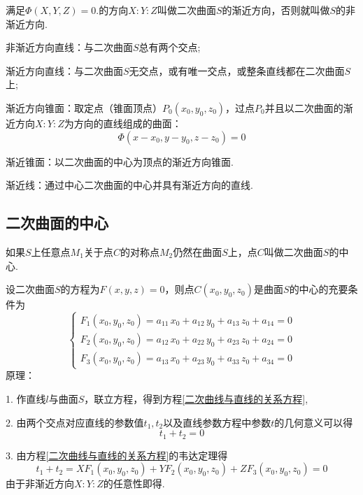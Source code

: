 满足$\varPhi(X,Y,Z) = 0.$的方向$X:Y:Z$叫做二次曲面$S$的{\color{dy}渐近方向}，否则就叫做$S$的{\color{dy}非渐近方向}.
\par \kg  \kg 非渐近方向直线：与二次曲面$S$总有两个交点;
\par \kg \kg 渐近方向直线：与二次曲面$S$无交点，或有唯一交点，或整条直线都在二次曲面$S$上;
\par {\color{dy}渐近方向锥面}：取定点（锥面顶点）$P_0(x_0,y_0,z_0)$，过点$P_0$并且以二次曲面的渐近方向$X:Y:Z$为方向的直线组成的曲面：
$$
\varPhi(x-x_0,y-y_0,z-z_0) = 0
$$
\par {\color{dy}渐近锥面}：以二次曲面的中心为顶点的渐近方向锥面.
\par {\color{dy}渐近线}：通过中心二次曲面的中心并具有渐近方向的直线.

\subsection{二次曲面的中心}
\tdefination[二次曲面的中心]
如果$S$上任意点$M_1$关于点$C$的对称点$M_2$仍然在曲面$S$上，点$C$叫做二次曲面$S$的{\color{dy}中心}.

\theorem[中心方程组]
设二次曲面$S$的方程为$F(x,y,z)=0$，则点$C(x_0,y_0,z_0)$是曲面$S$的中心的充要条件为
\begin{equation}
\label{中心方程组}
\begin{cases}
F_1(x_0,y_0,z_0)=a_{11} \, x_0 + a_{12} \, y_0 + a_{13} \, z_0 + a_{14} = 0 \\
F_2(x_0,y_0,z_0)=a_{12} \, x_0 + a_{22} \, y_0 + a_{23} \, z_0 + a_{24} = 0 \\
F_3(x_0,y_0,z_0)=a_{13} \, x_0 + a_{23} \, y_0 + a_{33} \, z_0 + a_{34} = 0
\end{cases}
\end{equation}
{\color{dy}原理}：
\par 1. \kg 作直线$l$与曲面$S$，联立方程，得到方程\eqref{二次曲线与直线的关系方程},
\par 2. \kg  由两个交点对应直线的参数值$t_1,t_2$以及直线参数方程中参数$t$的几何意义可以得
$$
t_1+t_2=0
$$
\par 3. \kg 由方程\eqref{二次曲线与直线的关系方程}的韦达定理得
\begin{equation}
\label{中心方程的推导}
t_1+t_2=XF_1(x_0,y_0,z_0)  +YF_2(x_0,y_0,z_0)+ZF_3(x_0,y_0,z_0)=0
\end{equation}
由于非渐近方向$X:Y:Z$的任意性即得.

